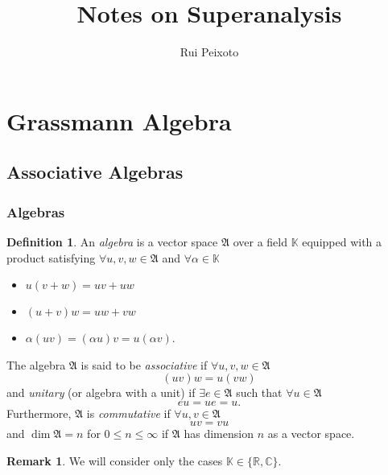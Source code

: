 \documentclass{article}
\title{Notes on Superanalysis}
\author{Rui Peixoto}
\date{}
\theoremstyle{definition}
\newtheorem{definition}{Definition}
\newtheorem*{remark}{Remark}
\begin{document}
\maketitle

\section{Grassmann Algebra}

\subsection{Associative Algebras}

\subsubsection{Algebras}

\begin{definition}
    An \emph{algebra} is a vector space $\mathfrak{A}$ over a field $\mathbb{K}$ equipped with a product satisfying $\forall u, v, w \in \mathfrak{A}$ and $\forall \alpha \in \mathbb{K}$
    \begin{itemize}
        \item $u(v + w) = uv + uw$
        \item $(u + v)w = uw + vw$
        \item $\alpha (u v) = (\alpha u) v = u (\alpha v)$.
    \end{itemize}

    The algebra $\mathfrak{A}$ is said to be \emph{associative} if $\forall u, v, w \in \mathfrak{A}$
    \begin{equation*}
        (uv)w = u(vw)
    \end{equation*}
    and \emph{unitary} (or algebra with a unit) if $\exists e \in \mathfrak{A}$ such that $\forall u \in \mathfrak{A}$
    \begin{equation*}
        eu = ue = u.
    \end{equation*}
    Furthermore, $\mathfrak{A}$ is \emph{commutative} if $\forall u, v \in \mathfrak{A}$
    \begin{equation*}
        uv = vu
    \end{equation*}
    and $\dim \mathfrak{A} = n$ for $0 \leq n \leq \infty$ if $\mathfrak{A}$ has dimension $n$ as a vector space.
\end{definition}

\begin{remark}
    We will consider only the cases $\mathbb{K} \in \{\mathbb{R}, \mathbb{C}\}$.
\end{remark}
\end{document}
